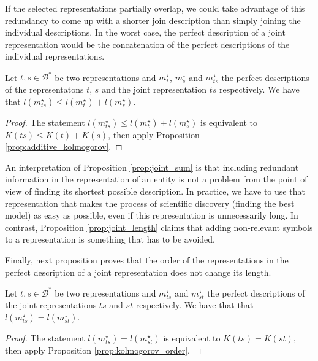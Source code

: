 If the selected representations partially overlap, we could take advantage of this redundancy to come up with a shorter join description than simply joining the individual descriptions. In the worst case, the perfect description of a joint representation would be the concatenation of the perfect descriptions of the individual representations.

\begin{proposition}
\label{prop:joint_sum}
Let $t,s \in \mathcal{B}^\ast$ be two representations and $m_{t}^{\star}$, $m_{s}^{\star}$ and $m_{ts}^{\star}$ the perfect descriptions of the representatons $t$, $s$ and the joint representation $ts$ respectively. We have that $l \left( m_{ts}^{\star} \right) \leq l \left( m_{t}^{\star} \right) + l \left( m_{s}^{\star} \right)$.
\end{proposition}
\begin{proof}
The statement $l \left( m_{ts}^{\star} \right) \leq l \left( m_{t}^{\star} \right) + l \left( m_{s}^{\star} \right)$ is equivalent to $K(ts) \leq K(t) + K(s)$, then apply Proposition \ref{prop:additive_kolmogorov}.
\end{proof}

An interpretation of Proposition \ref{prop:joint_sum} is that including redundant information in the representation of an entity is not a problem from the point of view of finding its shortest possible description. In practice, we have to use that representation that makes the process of scientific discovery (finding the best model) as easy as possible, even if this representation is unnecessarily long. In contrast, Proposition \ref{prop:joint_length} claims that adding non-relevant symbols to a representation is something that has to be avoided.

Finally, next proposition proves that the order of the representations in the perfect description of a joint representation does not change its length.

\begin{proposition}
\label{prop:joint_order}
Let $t,s \in \mathcal{B}^\ast$ be two representations and $m_{ts}^{\star}$ and $m_{st}^{\star}$ the perfect descriptions of the joint representations $ts$ and $st$ respectively. We have that that $l \left( m_{ts}^{\star} \right) = l \left( m_{st}^{\star} \right)$.
\end{proposition}
\begin{proof}
The statement $l \left( m_{ts}^{\star} \right) = l \left( m_{st}^{\star} \right)$ is equivalent to $K(ts) = K(st)$, then apply Proposition \ref{prop:kolmogorov_order}.
\end{proof}

